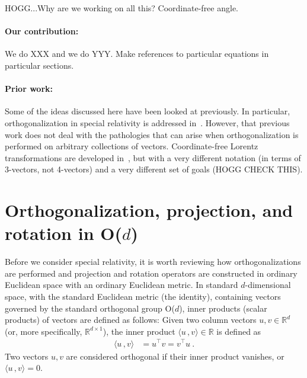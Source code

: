 \documentclass{article}
\newcommand{\inner}[2]{\langle{#1}\,,{#2}\rangle}
\begin{document}
HOGG...Why are we working on all this? Coordinate-free angle.

\paragraph{Our contribution:}
We do XXX and we do YYY. Make references to particular equations in particular sections.

\paragraph{Prior work:}
Some of the ideas discussed here have been looked at previously.
In particular, orthogonalization in special relativity is addressed in~\cite{joot}.
However, that previous work does not deal with the pathologies that can arise when orthogonalization is performed on arbitrary collections of vectors.
Coordinate-free Lorentz transformations are developed in~\cite{wagner}, but with a very different notation (in terms of 3-vectors, not 4-vectors) and a very different set of goals (HOGG CHECK THIS).

\section{Orthogonalization, projection, and rotation in O($d$)}\label{sec:od}

Before we consider special relativity, it is worth reviewing how orthogonalizations are performed and projection and rotation operators are constructed in ordinary Euclidean space with an ordinary Euclidean metric.
In standard $d$-dimensional space, with the standard Euclidean metric (the identity), containing vectors governed by the standard orthogonal group O($d$), inner products (scalar products) of vectors are defined as follows:
Given two column vectors $u,v\in\mathbb{R}^d$ (or, more specifically, $\mathbb{R}^{d\times1}$), the inner product $\inner{u}{v}\in\mathbb{R}$ is defined as
\begin{align}
    \inner{u}{v} &= u^\top v = v^\top u ~.
\end{align}
Two vectors $u,v$ are considered orthogonal if their inner product vanishes, or $\inner{u}{v}=0$.
\end{document}
